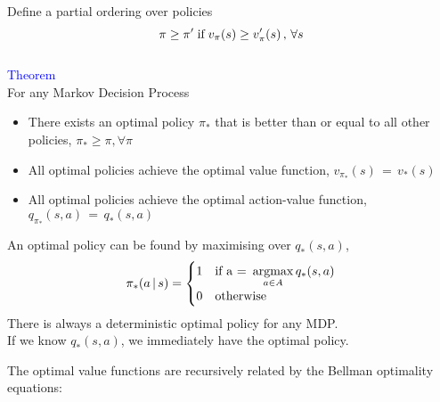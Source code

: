 \documentclass[landscape]{article}
\DeclareMathOperator*{\argmax}{argmax}
\def\tcb{\textcolor{blue}}
\begin{document}
\newpage
\newvgtitle{\tcb{Optimal Policy}}
\LARGE
\vspace{-.5em}
\vspace{0.5cm}
Define a partial ordering over policies
\begin{equation}\notag
    \pi\ge\pi'\;\text{if} \;v_\pi (s) \ge v_\pi '(s)\,,\, \forall s
\end{equation}\\
\vspace{0.5cm}
\Huge
\tcb{Theorem}
\LARGE \\
For any Markov Decision Process
\begin{itemize}
    \item There exists an optimal policy $\pi_*$ that is better than or equal
to all other policies, $\pi_* \ge \pi, \forall \pi $\\
    \item All optimal policies achieve the optimal value function, $v_{\pi_*} (s) \, = \, v_*(s)$ \\
    \item All optimal policies achieve the optimal action-value function,
    $q_{\pi_*} (s,a) \, = \, q_*(s,a)$ \\
\end{itemize}
\vspace{0.5cm}
An optimal policy can be found by maximising over $ q_*(s,a)$,
\begin{equation}\notag
    \pi_* (a\,|\,s) = \begin{cases} 1 & \text{if a = } \argmax\limits_{a \in A} q_* (s,a)\\
    0  & \text{otherwise}
    \end{cases}
\end{equation}
There is always a deterministic optimal policy for any MDP.\\
If we know $q_* (s, a)$, we immediately have the optimal policy.
\vspace{0.5cm}

\newpage
\newvgtitle{\tcb{Bellman Optimality Equation}}
\LARGE
\vspace{-.5em}
\vspace{0.5cm}
The optimal value functions are recursively related by the Bellman
optimality equations:
\end{document}
